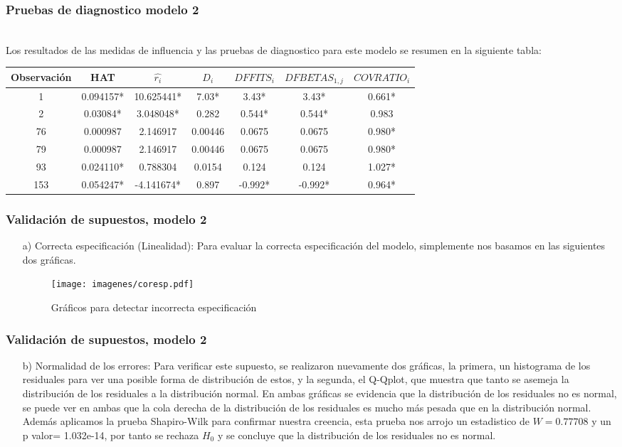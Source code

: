 \documentclass[12pt]{beamer}
\begin{document}
\begin{frame}
\frametitle{Pruebas de diagnostico modelo 2}
~\\Los resultados de las medidas de influencia y las pruebas de diagnostico para este modelo se resumen en la siguiente tabla:

\begin{center}
\resizebox{12.2cm}{!} {
\begin{tabular}{|ccccccc|}
\hline 
Observación & HAT & $\hat{r_{i}} $ &$D_{i}$ & $DFFITS_{i}$ & $DFBETAS_{1,j}$ & $COVRATIO_{i}$ \\ 
\hline 
1 & 0.094157* & 10.625441* & 7.03* & 3.43* &  3.43* & 0.661* \\ 
2 & 0.03084* & 3.048048* & 0.282 & 0.544* & 0.544* & 0.983 \\  
76 & 0.000987 & 2.146917  & 0.00446 & 0.0675 &  0.0675 & 0.980* \\  
79 & 0.000987 & 2.146917 & 0.00446 & 0.0675  & 0.0675 & 0.980* \\ 
93 & 0.024110* & 0.788304 & 0.0154 & 0.124  & 0.124 & 1.027* \\ 
153 & 0.054247* & -4.141674*  & 0.897 & -0.992*  & -0.992* & 0.964* \\ 
\hline 
\end{tabular} 
}
\end{center}
\end{frame}

\begin{frame}
\frametitle{Validación de supuestos, modelo 2}
\begin{itemize}
\item[a)] Correcta especificación (Linealidad): Para evaluar la correcta especificación del modelo, simplemente nos basamos en las siguientes dos gráficas. 
\begin{figure}[h]
  \centering
  \texttt{[image: imagenes/coresp.pdf]}
  \caption{Gráficos para detectar incorrecta especificación }\label{figura1}
\end{figure}
\end{itemize}
\end{frame}

\begin{frame}
\frametitle{Validación de supuestos, modelo 2}
\begin{itemize}
\item[b)] Normalidad de los errores: Para verificar este supuesto, se realizaron nuevamente dos gráficas, la primera, un histograma de los residuales para ver una posible forma de distribución de estos, y la segunda, el Q-Qplot, que muestra que tanto se asemeja la distribución de los residuales a la distribución normal. En ambas gráficas se evidencia que la distribución de los residuales no es normal, se puede ver en ambas que la cola derecha de la distribución de los residuales es mucho más pesada que en la distribución normal. Además aplicamos la prueba Shapiro-Wilk para confirmar nuestra creencia, esta prueba nos arrojo un estadistico de $W = 0.77708$ y un p valor= 1.032e-14, por tanto se rechaza $H_{0}$ y se concluye que la distribución de los residuales no es normal.
\end{itemize}
\end{frame}
\end{document}
